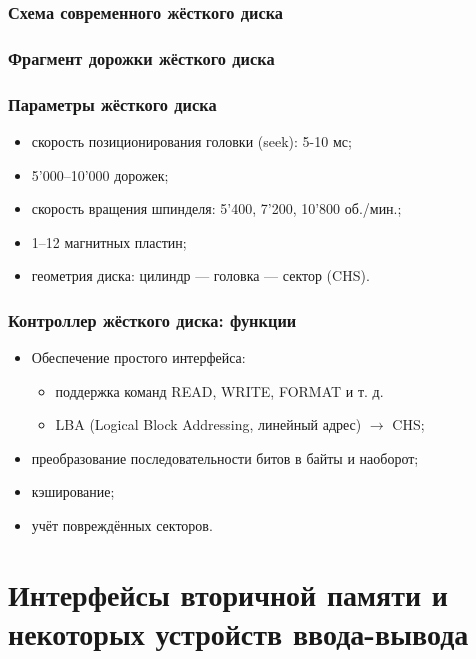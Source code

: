 \begin{frame}
\frametitle{Схема современного жёсткого диска}
\end{frame}

\begin{frame}
\frametitle{Фрагмент дорожки жёсткого диска}
\end{frame}

\begin{frame}
\frametitle{Параметры жёсткого диска}
\begin{itemize}[<+->]
    \item скорость позиционирования головки (seek): 5-10 мс;
    \item 5'000–10'000 дорожек;
    \item скорость вращения шпинделя: 5'400, 7'200, 10'800 об./мин.;
    \item 1–12 магнитных пластин;
    \item геометрия диска: цилиндр — головка — сектор (CHS).
\end{itemize}
\end{frame}


\begin{frame}
\frametitle{Контроллер жёсткого диска: функции}
\begin{itemize}
    \item Обеспечение простого интерфейса:
    \begin{itemize}
        \item поддержка команд READ, WRITE, FORMAT и т. д.
        \item LBA (Logical Block Addressing, линейный адрес) $\to$ CHS;
    \end{itemize}
    \item преобразование последовательности битов в байты и наоборот;
    \item кэширование;
    \item учёт повреждённых секторов.
\end{itemize}
\end{frame}

\section[Интерфейсы вторичной памяти и некоторых I/O-устройств]{Интерфейсы вторичной памяти и некоторых устройств ввода-вывода}

